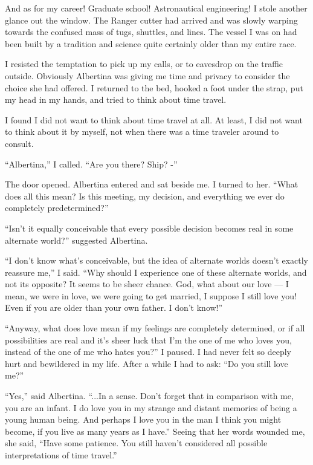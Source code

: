 \documentclass[english,11pt,letterpaper,onecolumn]{scrbook}
\begin{document}
	And as for my career!  Graduate school!  Astronautical engineering!  I stole another glance out the window.  The  Ranger cutter had arrived and was slowly warping towards the confused mass of tugs, shuttles, and lines.  The vessel I was on had been built by a tradition and science quite certainly older than my entire race.

	I resisted the temptation to pick up my calls, or to eavesdrop on the traffic outside.  Obviously Albertina was giving me time and privacy to consider the choice she had offered.  I returned to the bed, hooked a foot under the strap, put my head in my hands, and tried to think about time travel.  

	I found I did not want to think about time travel at all.  At least, I did not want to think about it by myself, not when there was a time traveler around to consult.

	``Albertina,'' I called.  ``Are you there?  Ship? -''

	The door opened.  Albertina entered and sat beside me.  I turned to her.  ``What does all this mean?  Is this meeting, my decision, and everything we ever do completely predetermined?''

	``Isn't it equally conceivable that every possible decision becomes real in some alternate world?'' suggested Albertina.

	``I don't know what's conceivable, but the idea of alternate worlds doesn't exactly reassure me,'' I said.  ``Why should I experience one of these alternate worlds, and not its opposite?  It seems to be sheer chance.  God, what about our love --- I mean, we were in love, we were going to get married, I suppose I still love you!  Even if you are older than your own father.  I don't know!''  

	``Anyway, what does love mean if my feelings are completely determined, or if all possibilities are real and it's sheer luck that I'm the one of me who loves you, instead of the one of me who hates you?''  I paused.  I had never felt so deeply hurt and bewildered in my life.  After a while I had to ask: ``Do you still love me?''

	``Yes,'' said Albertina.  ``...In a sense.  Don't forget that in comparison with me, you are an infant.  I do love you in my strange and distant memories of being a young human being.  And perhaps I love you in the man I think you might become, if you live as many years as I have.''  Seeing that her words wounded me, she said, ``Have some patience.  You still haven't considered all possible interpretations of time travel.''
\end{document}
